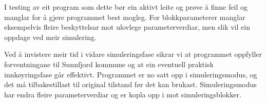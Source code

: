 I testing av eit program som dette bør ein aktivt leite og prøve å finne feil og manglar for å gjere programmet best mogleg.
For blokkparameterer manglar eksempelvis fleire beskyttelsar mot ulovlege parameterverdiar, men slik vil ein oppdage ved meir simulering.

Ved å invistere meir tid i vidare simuleringsfase sikrar vi at programmet oppfyller forventningane til Sunnfjord kommune og at ein eventuell
praktisk innkøyringsfase går effektivt. \newline
Programmet er no satt opp i simuleringsmodus, og det må tilbakestillast til original tilstand før det kan brukast. 
Simuleringsmodus har endra fleire parameterverdiar og er kopla opp i mot simuleringsblokker.  


\newpage